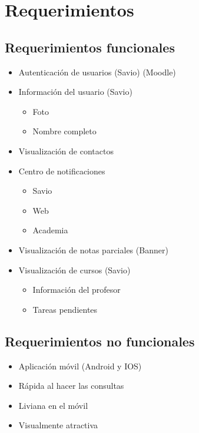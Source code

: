 \chapter{Requerimientos}

\section{Requerimientos funcionales}

\begin{itemize}
 \item Autenticación de usuarios (Savio) (Moodle)
 \item Información del usuario (Savio)
  \begin{itemize}
         \item Foto
         \item Nombre completo
    \end{itemize}
 \item Visualización de contactos
 \item Centro de notificaciones
     \begin{itemize}
         \item Savio
         \item Web
         \item Academia
    \end{itemize}
 \item Visualización de notas parciales (Banner)
 \item Visualización de cursos (Savio)
    \begin{itemize}
         \item Información del profesor
         \item Tareas pendientes
    \end{itemize}
\end{itemize}

\section{Requerimientos no funcionales}
 \begin{itemize}
         \item Aplicación móvil (Android y IOS)
         \item Rápida al hacer las consultas
         \item Liviana en el móvil 
         \item Visualmente atractiva
\end{itemize}

